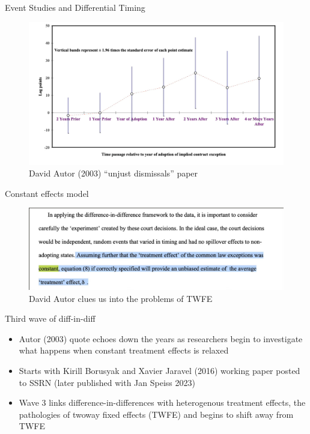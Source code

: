 \documentclass{beamer}
\begin{document}
\begin{frame}{Event Studies and Differential Timing}

	\begin{figure}
	\includegraphics[scale=0.35]{./lecture_includes/autor2003}
	\caption{David Autor (2003) ``unjust dismissals'' paper}
	\end{figure}

\end{frame}

\begin{frame}{Constant effects model}

	\begin{figure}
	\includegraphics[scale=0.25]{./lecture_includes/autor_quote}
	\caption{David Autor clues us into the problems of TWFE}
	\end{figure}

\end{frame}









\begin{frame}{Third wave of diff-in-diff}

\begin{itemize}

\item Autor (2003) quote echoes down the years as researchers begin to investigate what happens when constant treatment effects is relaxed
\item Starts with Kirill Borusyak and Xavier Jaravel (2016) working paper posted to SSRN (later published with Jan Speiss 2023)
\item Wave 3 links difference-in-differences with heterogenous treatment effects, the pathologies of twoway fixed effects (TWFE) and begins to shift away from TWFE
\end{itemize}

\end{frame}
\end{document}
